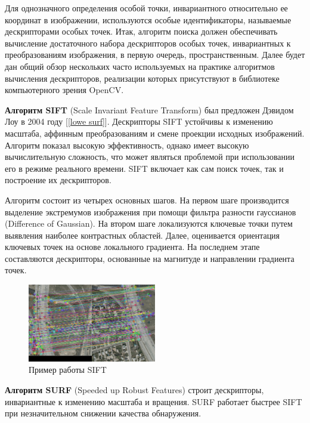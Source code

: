 {{	Для однозначного определения особой точки, инвариантного относительно ее координат в изображении, используются особые идентификаторы, называемые дескрипторами особых точек.
	Итак, алгоритм поиска должен обеспечивать вычисление достаточного набора дескрипторов особых точек, инвариантных к преобразованиям изображения, в первую очередь, пространственным. Далее будет дан общий обзор нескольких часто используемых на практике алгоритмов вычисления дескрипторов, реализации которых присутствуют в библиотеке компьютерного зрения OpenCV.
	
		 {\bf Алгоритм SIFT} (Scale Invariant Feature Transform) был предложен Дэвидом Лоу в 2004 году [\ref{lowe surf}]. Дескрипторы SIFT устойчивы к изменению масштаба, аффинным преобразованиям и смене проекции исходных изображений. Алгоритм показал высокую эффективность, однако имеет высокую вычислительную сложность, что может являться проблемой при использовании его в режиме реального времени. SIFT включает как сам поиск точек, так и построение их дескрипторов.
		
		Алгоритм состоит из четырех основных шагов. На первом шаге производится выделение экстремумов изображения при помощи фильтра разности гауссианов (Difference of Gaussian). На втором шаге локализуются ключевые точки путем выявления наиболее контрастных областей. Далее, оценивается ориентация ключевых точек на основе локального градиента. На последнем этапе составляются дескрипторы, основанные на магнитуде и направлении градиента точек.
		
		\begin{figure}[H]
			\centering                             
			\includegraphics[width=0.5\textwidth,keepaspectratio]{descriptors/sift.jpg}                 
			\centering\caption{ Пример работы SIFT }
			\label{descriptors sift}                           
		\end{figure}    
		
		{\bf Алгоритм SURF} (Speeded up Robust Features) строит дескрипторы, инвариантные к изменению масштаба и вращения. SURF работает быстрее SIFT при незначительном снижении качества обнаружения.
		
}}
